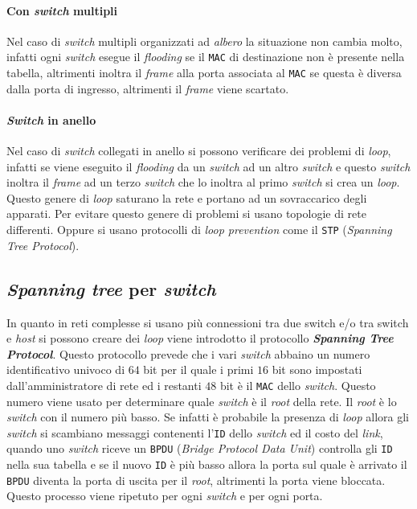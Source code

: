         \paragraph{Con \textit{switch} multipli} Nel caso di \textit{switch} multipli organizzati ad \textit{albero} la situazione non cambia molto, infatti ogni \textit{switch} esegue il \textit{flooding} se il \texttt{MAC} di destinazione non è presente nella tabella, altrimenti inoltra il \textit{frame} alla porta associata al \texttt{MAC} se questa è diversa dalla porta di ingresso, altrimenti il \textit{frame} viene scartato.
        \paragraph{\textit{Switch} in anello} Nel caso di \textit{switch} collegati in anello si possono verificare dei problemi di \textit{loop}, infatti se viene eseguito il \textit{flooding} da un \textit{switch} ad un altro \textit{switch} e questo \textit{switch} inoltra il \textit{frame} ad un terzo \textit{switch} che lo inoltra al primo \textit{switch} si crea un \textit{loop}. Questo genere di \textit{loop} saturano la rete e portano ad un sovraccarico degli apparati. Per evitare questo genere di problemi si usano topologie di rete differenti. Oppure si usano protocolli di \textit{loop prevention} come il \texttt{STP} (\textit{Spanning Tree Protocol}).
    \subsection{\textit{Spanning tree} per \textit{switch}}
        In quanto in reti complesse si usano più connessioni tra due switch e/o tra switch e \textit{host} si possono creare dei \textit{loop} viene introdotto il protocollo \textbf{\textit{Spanning Tree Protocol}}. Questo protocollo prevede che i vari \textit{switch} abbaino un numero identificativo univoco di $64$ bit per il quale i primi $16$ bit sono impostati dall'amministratore di rete ed i restanti $48$ bit è il \texttt{MAC} dello \textit{switch}. Questo numero viene usato per determinare quale \textit{switch} è il \textit{root} della rete. Il \textit{root} è lo \textit{switch} con il numero più basso.\newline
        Se infatti è probabile la presenza di \textit{loop} allora gli \textit{switch} si scambiano messaggi contenenti l'\texttt{ID} dello \textit{switch} ed il costo del \textit{link}, quando uno \textit{switch} riceve un \texttt{BPDU} (\textit{Bridge Protocol Data Unit}) controlla gli \texttt{ID} nella sua tabella e se il nuovo \texttt{ID} è più basso allora la porta sul quale è arrivato il \texttt{BPDU} diventa la porta di uscita per il \textit{root}, altrimenti la porta viene bloccata. Questo processo viene ripetuto per ogni \textit{switch} e per ogni porta.
